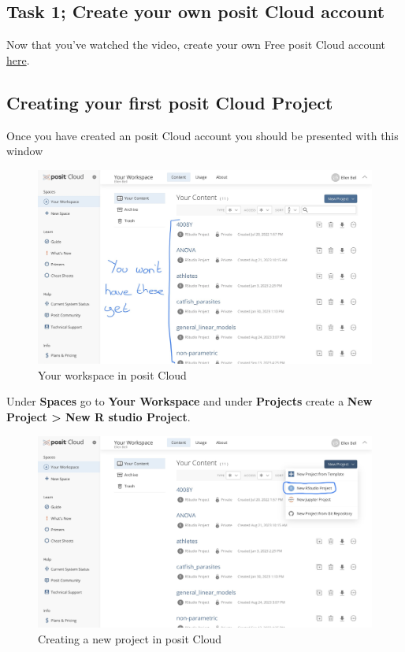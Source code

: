 \documentclass[
]{book}
\begin{document}
\hypertarget{task-1-create-your-own-posit-cloud-account}{%
\subsection{Task 1; Create your own posit Cloud account}\label{task-1-create-your-own-posit-cloud-account}}

Now that you've watched the video, create your own Free posit Cloud account \href{https://login.rstudio.cloud/login?redirect=\%2Foauth\%2Fauthorize\%3Fredirect_uri\%3Dhttps\%253A\%252F\%252Frstudio.cloud\%252Flogin\%26client_id\%3Drstudio-cloud\%26response_type\%3Dcode\%26show_auth\%3D0\%26show_login\%3D1}{here}.

\hypertarget{creating-your-first-posit-cloud-project}{%
\subsection{Creating your first posit Cloud Project}\label{creating-your-first-posit-cloud-project}}

Once you have created an posit Cloud account you should be presented with this window

\begin{figure}
\includegraphics[width=0.9\linewidth]{figures/posit1} \caption{Your workspace in posit Cloud}\label{fig:unnamed-chunk-1}
\end{figure}

Under \textbf{Spaces} go to \textbf{Your Workspace} and under \textbf{Projects} create a \textbf{New Project \textgreater{} New R studio Project}.

\begin{figure}
\includegraphics[width=0.9\linewidth]{figures/posit2} \caption{Creating a new project in posit Cloud}\label{fig:unnamed-chunk-2}
\end{figure}
\end{document}
